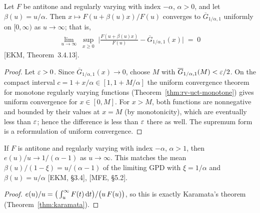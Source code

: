 \begin{theorem}
  \label{thm:pickands-balkema-de-haan}
  \leanok
  Let $F$ be antitone and regularly varying with index $-\alpha$, $\alpha > 0$, and let
  $\beta(u) = u/\alpha$. Then $x \mapsto F(u + \beta(u) x)/F(u)$ converges to
  $\overline{G}_{1/\alpha, 1}$ uniformly on $[0, \infty)$ as $u \to \infty$; that is,
  \begin{align*}
    \lim_{u \to \infty} \; \sup_{x \ge 0} \; \Big| \frac{F(u + \beta(u) x)}{F(u)}
      - \overline{G}_{1/\alpha, 1}(x) \Big| \; = \; 0
  \end{align*}
  [EKM, Theorem~3.4.13].
\end{theorem}
\begin{proof}
  \leanok
  Let $\varepsilon > 0$. Since $\overline{G}_{1/\alpha,1}(x) \to 0$, choose $M$ with
  $\overline{G}_{1/\alpha,1}(M) < \varepsilon/2$. On the compact interval $c = 1 + x/\alpha \in [1, 1 + M/\alpha]$
  the uniform convergence theorem for monotone regularly varying functions
  (Theorem~\ref{thm:rv-uct-monotone}) gives uniform convergence for $x \in [0, M]$. For $x > M$,
  both functions are nonnegative and bounded by their values at $x = M$ (by monotonicity), which
  are eventually less than $\varepsilon$; hence the difference is less than $\varepsilon$ there as well.
  The supremum form is a reformulation of uniform convergence.
\end{proof}

\begin{theorem}
  \label{thm:mean-excess}
  \leanok
  If $F$ is antitone and regularly varying with index $-\alpha$, $\alpha > 1$, then
  $e(u)/u \to 1/(\alpha - 1)$ as $u \to \infty$. This matches the mean
  $\beta(u)/(1 - \xi) = u/(\alpha - 1)$ of the limiting GPD with $\xi = 1/\alpha$ and
  $\beta(u) = u/\alpha$ [EKM, \S3.4], [MFE, \S5.2].
\end{theorem}
\begin{proof}
  \leanok
  $e(u)/u = \big( \int_u^\infty F(t) \, \mathrm{d} t \big) / \big( u \, F(u) \big)$, so this is exactly
  Karamata's theorem (Theorem~\ref{thm:karamata}).
\end{proof}


